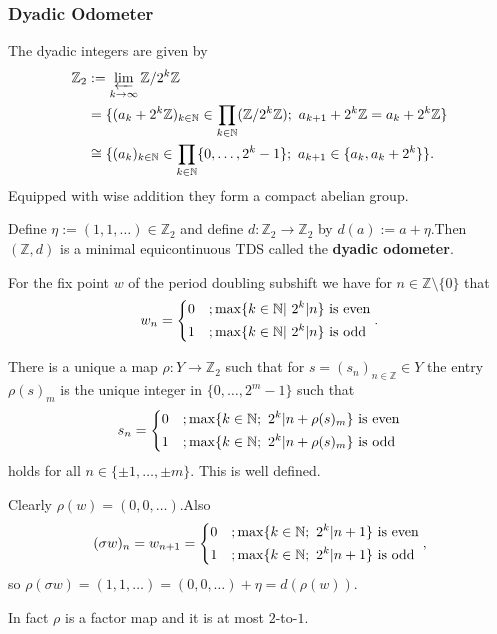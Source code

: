 \begin{frame}
	\frametitle{Dyadic Odometer}
	The dyadic integers are given by
	\begin{align*}
		\mathbb{Z}_2 &:= \varprojlim_{k \to \infty} \mathbb{Z}/2^k\mathbb{Z}\\
		&= \{(a_k + 2^k\mathbb{Z})_{k \in \mathbb{N}} \in \prod_{k \in \mathbb{N}} (\mathbb{Z}/2^k\mathbb{Z});\ a_{k+1} + 2^k\mathbb{Z} = a_k + 2^k\mathbb{Z}\}\\
		&\cong \{(a_k)_{k \in \mathbb{N}} \in \prod_{k \in \mathbb{N}} \{0, \dots, 2^k-1\};\ a_{k+1} \in \{a_k, a_k + 2^k\}\}.
	\end{align*}\pause
	Equipped with wise addition they form a compact abelian group.\pause
	
	Define $\eta := (1, 1, \dots) \in \mathbb{Z}_2$ and define $d: \mathbb{Z}_2 \to \mathbb{Z}_2$ by $d(a) := a + \eta$.\pause Then $(\mathbb{Z}, d)$ is a minimal equicontinuous TDS called the \textbf{dyadic odometer}.
\end{frame}

\begin{frame}
	For the fix point $w$ of the period doubling subshift we have for $n \in \mathbb{Z} \setminus \{0\}$ that
	\begin{align*}
		w_n =
		\begin{dcases}
			0 &; \max\{k \in \mathbb{N}|\ 2^k | n\} \text{ is even}\\
			1 &; \max\{k \in \mathbb{N}|\ 2^k | n\} \text{ is odd}
		\end{dcases}.
	\end{align*}\pause
	\medskip
	
	There is a unique a map $\rho: Y \to \mathbb{Z}_2$ such that for $ s = (s_n)_{n \in \mathbb{Z}} \in Y$ the entry $\rho(s)_m$ is the unique integer in $\{0, \dots, 2^m-1\}$ such that
	\begin{align*}
		s_n =
		\begin{dcases}
			0 &; \max\{k \in \mathbb{N};\ 2^k | n + \rho(s)_m\} \text{ is even}\\
			1 &; \max\{k \in \mathbb{N};\ 2^k | n + \rho(s)_m\} \text{ is odd}
		\end{dcases}
	\end{align*}
	holds for all $n \in \{\pm 1, \dots, \pm m\}$. This is well defined.\pause
	\medskip
	
	Clearly $\rho(w) = (0, 0, \dots)$.\pause Also
	\begin{align*}
		(\sigma w)_n = w_{n+1} =
		\begin{dcases}
			0 &; \max\{k \in \mathbb{N};\ 2^k | n+1\} \text{ is even}\\
			1 &; \max\{k \in \mathbb{N};\ 2^k | n+1\} \text{ is odd}
		\end{dcases},
	\end{align*}
	so $\rho(\sigma w) = (1, 1, \dots ) = (0, 0, \dots) + \eta = d(\rho(w))$.\pause
	
	In fact $\rho$ is a factor map and it is at most $2$-to-$1$.
\end{frame}

